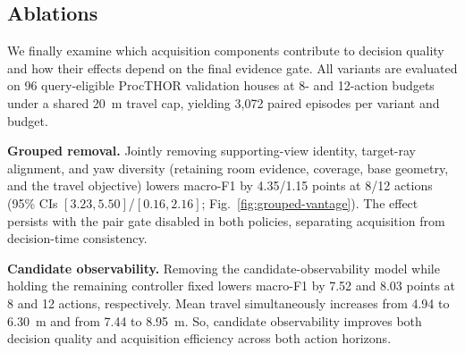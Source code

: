 \documentclass[letterpaper, 10 pt, conference]{ieeeconf}
\begin{document}
\begin{table}[b]
  \centering
   \caption{Component ablations on 96 ProcTHOR validation houses. Loss is the macro-F1 drop from the full model (pp).}
  \label{tab:component-validation}

  \small
  \setlength{\tabcolsep}{2pt}
  \renewcommand{\arraystretch}{1.18}

  
\end{table}
    
    \subsection{Ablations}

    We finally examine which acquisition components contribute to decision quality and how their effects depend on the final evidence gate. All variants are evaluated on 96 query-eligible ProcTHOR validation houses at 8- and 12-action budgets under a shared 20~m travel cap, yielding 3,072 paired episodes per variant and budget.


    \textbf{Grouped removal.} Jointly removing supporting-view identity, target-ray alignment, and yaw diversity (retaining room evidence, coverage, base geometry, and the travel objective) lowers macro-F1 by 4.35/1.15 points at 8/12 actions (95\% CIs $[3.23,5.50]$/$[0.16,2.16]$; Fig.~\ref{fig:grouped-vantage}). The effect persists with the pair gate disabled in both policies, separating acquisition from decision-time consistency.

    \textbf{Candidate observability.}
    Removing the candidate-observability model while holding the remaining
    controller fixed lowers macro-F1 by 7.52 and 8.03 points at 8 and
    12 actions, respectively. Mean travel simultaneously increases from
    4.94 to 6.30~m and from 7.44 to 8.95~m. So, candidate observability
    improves both decision quality and acquisition efficiency across both
    action horizons.
    
\end{document}
